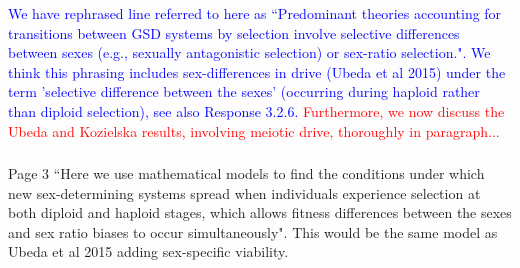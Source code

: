\documentclass[10pt,letterpaper]{article}
\begin{document}
\textcolor{blue}{
We have rephrased line referred to here as ``Predominant theories accounting for transitions between GSD systems by selection involve selective differences between sexes (e.g., sexually antagonistic selection) or sex-ratio selection.".
We think this phrasing includes sex-differences in drive (Ubeda et al 2015) under the term 'selective difference between the sexes' (occurring during haploid rather than diploid selection), see also Response 3.2.6. }
\textcolor{red}{Furthermore, we now discuss the Ubeda and Kozielska results, involving meiotic drive, thoroughly in paragraph...
}


\noindent\subsubsection{}
Page 3 ``Here we use mathematical models to find the conditions under which new sex-determining systems spread when individuals experience selection at both diploid and haploid stages, which allows fitness differences between the sexes and sex ratio biases to occur simultaneously".
This would be the same model as Ubeda et al 2015 adding sex-specific viability.
\end{document}
